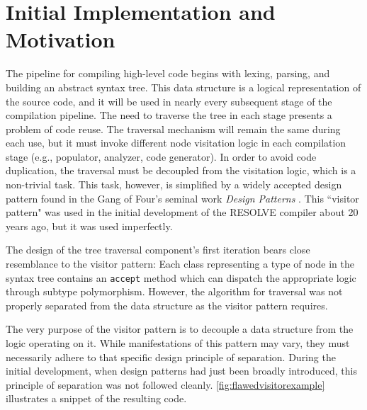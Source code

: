 \documentclass[times]{speauth}
\begin{document}
\section{Initial Implementation and Motivation}
The pipeline for compiling high-level code begins with lexing, parsing, and building an abstract syntax tree. This data structure is a logical representation of the source code, and it will be used in nearly every subsequent stage of the compilation pipeline. The need to traverse the tree in each stage presents a problem of code reuse. The traversal mechanism will remain the same during each use, but it must invoke different node visitation logic in each compilation stage (e.g., populator, analyzer, code generator). In order to avoid code duplication, the traversal must be decoupled from the visitation logic, which is a non-trivial task. This task, however, is simplified by a widely accepted design pattern found in the Gang of Four's seminal work \textit{Design Patterns} \cite{gamma:1995}. This ``visitor pattern" was used in the initial development of the RESOLVE compiler about 20 years ago, but it was used imperfectly.

The design of the tree traversal component's first iteration bears close resemblance to the visitor pattern: Each class representing a type of node in the syntax tree contains an \texttt{accept} method which can dispatch the appropriate logic through subtype polymorphism. However, the algorithm for traversal was not properly separated from the data structure as the visitor pattern requires.

The very purpose of the visitor pattern is to decouple a data structure from the logic operating on it. While manifestations of this pattern may vary, they must necessarily adhere to that specific design principle of separation. During the initial development, when design patterns had just been broadly introduced, this principle of separation was not followed cleanly. \ref{fig:flawedvisitorexample} illustrates a snippet of the resulting code.
\end{document}
